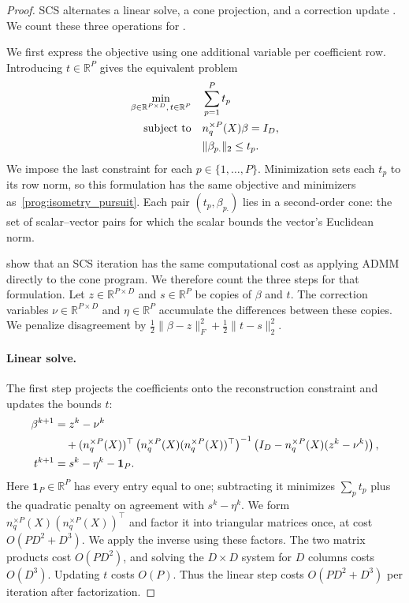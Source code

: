 \begin{proof}
SCS alternates a linear solve, a cone projection, and a correction update \citep[Section~3.2, Eq.~(17)]{ocpb:16}.
We count these three operations for \isometrypursuit.

We first express the objective using one additional variable per coefficient row.
Introducing $t\in\mathbb R^P$ gives the equivalent problem
\begin{align}
\min_{\beta\in\mathbb R^{P\times D},\,t\in\mathbb R^P}
&\quad\sum_{p=1}^P t_p \notag\\
\text{subject to}&\quad n_q^{\times P}(X)\beta=I_D, \\
&\quad\|\beta_{p.}\|_2\leq t_p.
\end{align}
We impose the last constraint for each $p\in\{1,\ldots,P\}$.
Minimization sets each $t_p$ to its row norm, so this formulation has the same objective and minimizers as~\eqref{prog:isometry_pursuit}.
Each pair $(t_p,\beta_{p.})$ lies in a second-order cone: the set of scalar--vector pairs for which the scalar bounds the vector's Euclidean norm.

\citet[Section~3.2]{ocpb:16} show that an SCS iteration has the same computational cost as applying ADMM directly to the cone program.
We therefore count the three steps for that formulation.
Let $z\in\mathbb R^{P\times D}$ and $s\in\mathbb R^P$ be copies of $\beta$ and $t$.
The correction variables $\nu\in\mathbb R^{P\times D}$ and $\eta\in\mathbb R^P$ accumulate the differences between these copies.
We penalize disagreement by $\frac12\|\beta-z\|_F^2+\frac12\|t-s\|_2^2$.

\paragraph{Linear solve.}
The first step projects the coefficients onto the reconstruction constraint and updates the bounds $t$:
\begin{align}
\beta^{k+1}&=z^k-\nu^k \notag\\
&\quad+(n_q^{\times P}(X))^\top
\left(n_q^{\times P}(X)(n_q^{\times P}(X))^\top\right)^{-1}
\left(I_D-n_q^{\times P}(X)(z^k-\nu^k)\right), \\
t^{k+1}&=s^k-\eta^k-\mathbf 1_P.
\end{align}
Here $\mathbf 1_P\in\mathbb R^P$ has every entry equal to one; subtracting it minimizes $\sum_p t_p$ plus the quadratic penalty on agreement with $s^k-\eta^k$.
We form $n_q^{\times P}(X)(n_q^{\times P}(X))^\top$ and factor it into triangular matrices once, at cost $O(PD^2+D^3)$.
We apply the inverse using these factors.
The two matrix products cost $O(PD^2)$, and solving the $D\times D$ system for $D$ columns costs $O(D^3)$.
Updating $t$ costs $O(P)$.
Thus the linear step costs $O(PD^2+D^3)$ per iteration after factorization.


\end{proof}
